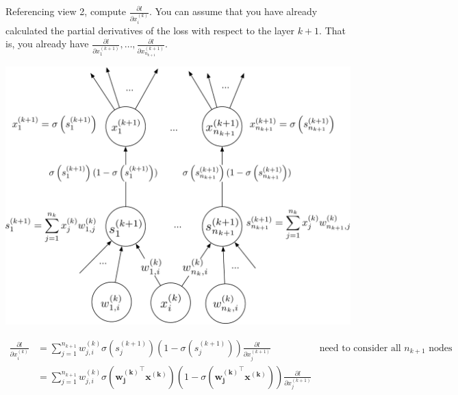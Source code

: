 \documentclass[assignment06_Solutions]{subfiles}
\begin{document}
\begin{exercise}[(75 minutes)]
\item Referencing view 2, compute $\frac{\partial l}{\partial x^{(k)}_i}$.  You can assume that you have already calculated the partial derivatives of the loss with respect to the layer $k+1$.  That is, you already have $\frac{\partial l}{\partial x^{(k+1)}_1}, \ldots, \frac{\partial l}{\partial x^{(k+1)}_{n_{k+1}}}$.

\begin{boxedsolution}
\begin{center}
\includegraphics[width=0.9\linewidth]{figures/5bsolution}
\end{center}
\begin{align}
\frac{\partial l}{\partial x^{(k)}_i} &= \sum_{j=1}^{n_{k+1}} w^{(k)}_{j,i} \sigma \left (s^{(k+1)}_{j} \right) \left (1-\sigma \left (s^{(k+1)}_{j} \right)\right) \frac{\partial l}{\partial x^{(k+1)}_j}&  \mbox{need to consider all $n_{k+1}$ nodes} \nonumber \\
&= \sum_{j=1}^{n_{k+1}} w^{(k)}_{j,i} \sigma \left ( \mathbf{w_j^{(k)}}^\top \mathbf{x^{(k)}} \right) \left (1-\sigma \left ( \mathbf{w_j^{(k)}}^\top \mathbf{x^{(k)}}\right)\right) \frac{\partial l}{\partial x^{(k+1)}_j}
\end{align}
\end{boxedsolution}


\end{exercise}
\end{document}
